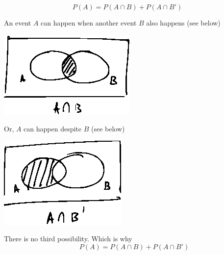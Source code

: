 \documentclass[14pt,fleqn]{extarticle}
\newcommand\prob[1]{ P \left(#1 \right) }
\begin{document}
 
\begin{snippet}
    \correct
    
    \[ \prob{A} = \prob{A\cap B} + \prob{A\cap B'} \]
    
    \reason
    
    An event $A$ can happen when another event $B$ also happens (see below) 
    \begin{center}
\includegraphics[scale=1.4]{97-A.eps}
\end{center}

Or, $A$ can happen despite $B$ (see below) 
\begin{center}
\includegraphics[scale=1.4]{97-B.eps}
\end{center}

There is no third possibility. Which is why 
\[ \qquad \prob{A} = \prob{A\cap B} + \prob{A\cap B'} \]
\end{snippet} 
\end{document}
